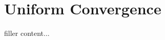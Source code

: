 \documentclass[../../templates/section]{subfiles}
\begin{document}
\section{Uniform Convergence}\label{sec:uniform-convergence}

filler content...
\end{document}
